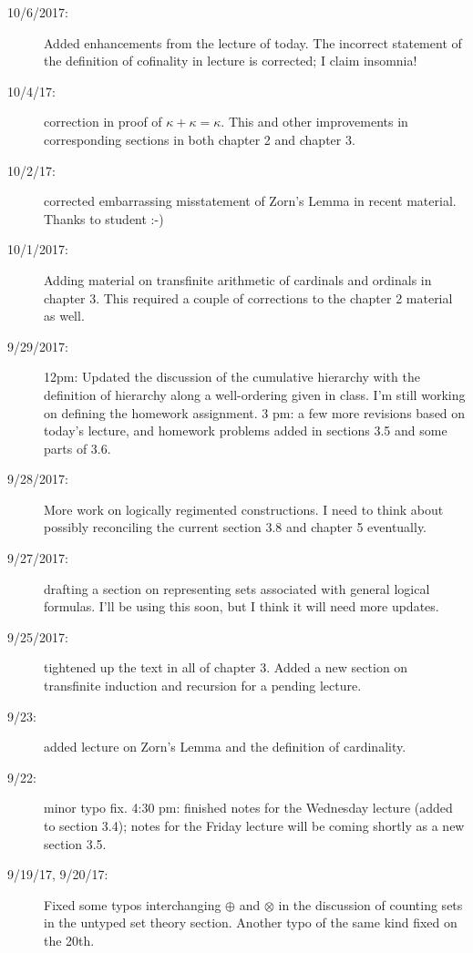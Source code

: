 \documentclass[12pt]{book}
\begin{document}
{\begin{description}
\item[10/6/2017:]  Added enhancements from the lecture of today.  The incorrect statement of the definition of cofinality in lecture is corrected; I claim insomnia!

\item[10/4/17:]  correction in proof of $\kappa+\kappa=\kappa$.  This and other improvements in corresponding sections in both chapter 2 and chapter 3.

\item[10/2/17:]  corrected embarrassing misstatement of Zorn's Lemma in recent material.  Thanks to student :-)

\item[10/1/2017:]  Adding material on transfinite arithmetic of cardinals and ordinals in chapter 3.  This required a couple of corrections to the chapter 2 material as well.

\item[9/29/2017:]  12pm:  Updated the discussion of the cumulative hierarchy with the definition of hierarchy along a well-ordering given in class.  I'm still working on defining the homework assignment.  3 pm:  a few more revisions based on today's lecture, and homework problems added in sections 3.5 and some parts of 3.6.

\item[9/28/2017:]  More work on logically regimented constructions.  I need to think about possibly reconciling the current section 3.8 and chapter 5 eventually.

\item[9/27/2017:]  drafting a section on representing sets associated with general logical formulas.  I'll be using this soon, but I think it will need more updates.

\item[9/25/2017:]  tightened up the text in all of chapter 3.  Added a new section on transfinite induction and recursion for a pending lecture.

\item[9/23:]  added lecture on Zorn's Lemma and the definition of cardinality.

\item[9/22:]  minor typo fix.  4:30 pm:  finished notes for the Wednesday lecture (added to section 3.4); notes for the Friday lecture will be coming shortly as a new section 3.5.

\item[9/19/17, 9/20/17:]  Fixed some typos interchanging $\oplus$ and $\otimes$ in the discussion of counting sets in the untyped set theory section.  Another typo of the same kind fixed on the 20th.


\end{description}}
\end{document}
